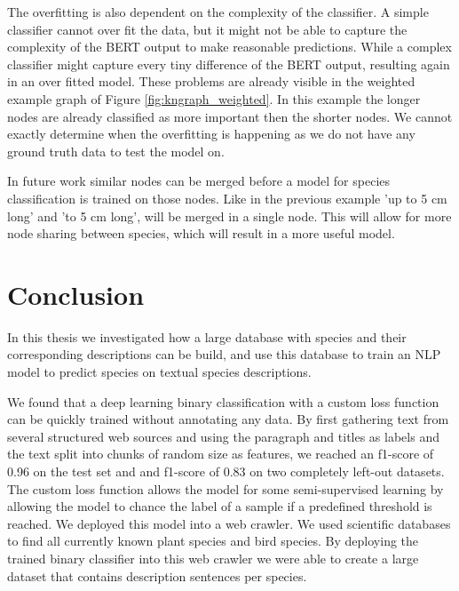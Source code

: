 \documentclass[a4paper, 12pt, oneside]{book} %
\begin{document}
The overfitting is also dependent on the complexity of the classifier. 
A simple classifier cannot over fit the data, but it might not be able to capture the complexity of the BERT output to make reasonable predictions.
While a complex classifier might capture every tiny difference of the BERT output, resulting again in an over fitted model.
These problems are already visible in the weighted example graph of Figure \ref{fig:kngraph_weighted}.
In this example the longer nodes are already classified as more important then the shorter nodes.
We cannot exactly determine when the overfitting is happening as we do not have any ground truth data to test the model on.

In future work similar nodes can be merged before a model for species classification is trained on those nodes.
Like in the previous example 'up to 5 cm long' and 'to 5 cm long', will be merged in a single node.
This will allow for more node sharing between species, which will result in a more useful model.

\newpage
\section{Conclusion} \label{par:conclusion}
In this thesis we investigated how a large database with species and their corresponding descriptions can be build, and use this database to train an NLP model to predict species on textual species descriptions.

We found that a deep learning binary classification with a custom loss function can be quickly trained without annotating any data.
By first gathering text from several structured web sources and using the paragraph and titles as labels and the text split into chunks of random size as features, we reached an f1-score of 0.96 on the test set and and f1-score of 0.83 on two completely left-out datasets.
The custom loss function allows the model for some semi-supervised learning by allowing the model to chance the label of a sample if a predefined threshold is reached.
We deployed this model into a web crawler.
We used scientific databases to find all currently known plant species and bird species.
By deploying the trained binary classifier into this web crawler we were able to create a large dataset that contains description sentences per species.
\end{document}
